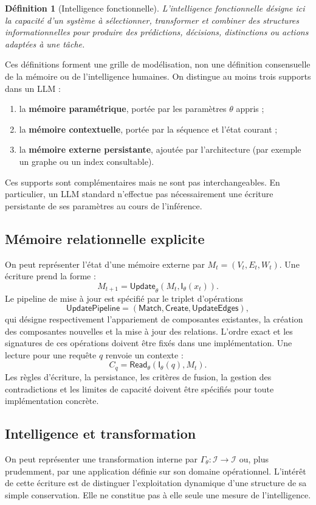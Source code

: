 \documentclass[11pt,a4paper]{article}
\newtheorem{definition}{Définition}[section]
\theoremstyle{remark}
\newcommand{\Ispace}{\mathcal I}
\newcommand{\Emp}{\mathsf I}
\newcommand{\1}{\mathbf 1}
\begin{document}
\begin{definition}[Intelligence fonctionnelle]
L'intelligence fonctionnelle désigne ici la capacité d'un système à sélectionner, transformer et combiner des structures informationnelles pour produire des prédictions, décisions, distinctions ou actions adaptées à une tâche.
\end{definition}

Ces définitions forment une grille de modélisation, non une définition consensuelle de la mémoire ou de l'intelligence humaines. On distingue au moins trois supports dans un LLM :
\begin{enumerate}[label=\alph*)]
  \item la \textbf{mémoire paramétrique}, portée par les paramètres $\theta$ appris ;
  \item la \textbf{mémoire contextuelle}, portée par la séquence et l'état courant ;
  \item la \textbf{mémoire externe persistante}, ajoutée par l'architecture (par exemple un graphe ou un index consultable).
\end{enumerate}
Ces supports sont complémentaires mais ne sont pas interchangeables. En particulier, un LLM standard n'effectue pas nécessairement une écriture persistante de ses paramètres au cours de l'inférence.

\subsection{Mémoire relationnelle explicite}
On peut représenter l'état d'une mémoire externe par $M_t=(V_t,E_t,W_t)$. Une écriture prend la forme :
\[
M_{t+1}=\mathsf{Update}_\theta(M_t,\Emp_\theta(x_t)).
\]
Le pipeline de mise à jour est spécifié par le triplet d’opérations
\[
\mathsf{UpdatePipeline}=(\mathsf{Match},\mathsf{Create},\mathsf{UpdateEdges}),
\]
qui désigne respectivement l’appariement de composantes existantes, la création des composantes nouvelles et la mise à jour des relations. L’ordre exact et les signatures de ces opérations doivent être fixés dans une implémentation. Une lecture pour une requête $q$ renvoie un contexte :
\[
C_q=\mathsf{Read}_\theta(\Emp_\theta(q),M_t).
\]
Les règles d'écriture, la persistance, les critères de fusion, la gestion des contradictions et les limites de capacité doivent être spécifiés pour toute implémentation concrète.

\subsection{Intelligence et transformation}
On peut représenter une transformation interne par $\Gamma_\theta:\Ispace\to\Ispace$ ou, plus prudemment, par une application définie sur son domaine opérationnel. L'intérêt de cette écriture est de distinguer l'exploitation dynamique d'une structure de sa simple conservation. Elle ne constitue pas à elle seule une mesure de l'intelligence.
\end{document}
